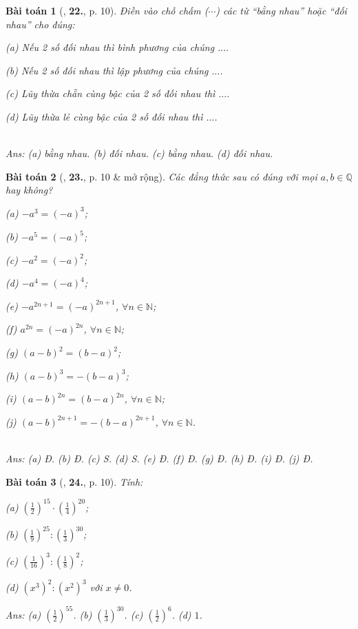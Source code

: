 \documentclass{article}
\numberwithin{equation}{section}
\newtheorem{baitoan}{Bài toán}
\begin{document}
\begin{baitoan}[\cite{Binh_Toan_7_tap_1}, \textbf{22.}, p. 10]
	Điền vào chỗ chấm ($\cdots$) các từ ``bằng nhau'' hoặc ``đối nhau'' cho đúng:
	\begin{enumerate*}
		\item[(a)] Nếu 2 số đối nhau thì bình phương của chúng $\ldots$.
		\item[(b)] Nếu 2 số đối nhau thì lập phương của chúng $\ldots$.
		\item[(c)] Lũy thừa chẵn cùng bậc của 2 số đối nhau thì $\ldots$.
		\item[(d)] Lũy thừa lẻ cùng bậc của 2 số đối nhau thì $\ldots$.
	\end{enumerate*}\\\mbox{}\hfill\textsf{Ans:} (a) bằng nhau. (b) đối nhau. (c) bằng nhau. (d) đối nhau.
\end{baitoan}

\begin{baitoan}[\cite{Binh_Toan_7_tap_1}, \textbf{23.}, p. 10 \& mở rộng]
	Các đẳng thức sau có đúng với mọi $a,b\in\mathbb{Q}$ hay không?
	\begin{enumerate*}
		\item[(a)] $-a^3 = (-a)^3$;
		\item[(b)] $-a^5 = (-a)^5$;
		\item[(c)] $-a^2 = (-a)^2$;
		\item[(d)] $-a^4 = (-a)^4$;
		\item[(e)] $-a^{2n+1} = (-a)^{2n+1}$, $\forall n\in\mathbb{N}$;
		\item[(f)] $a^{2n} = (-a)^{2n}$, $\forall n\in\mathbb{N}$;
		\item[(g)] $(a - b)^2 = (b - a)^2$;
		\item[(h)] $(a - b)^3 = -(b - a)^3$;
		\item[(i)] $(a - b)^{2n} = (b - a)^{2n}$, $\forall n\in\mathbb{N}$;
		\item[(j)] $(a - b)^{2n+1} = -(b - a)^{2n+1}$, $\forall n\in\mathbb{N}$.
	\end{enumerate*}\\\mbox{}\hfill\textsf{Ans:} (a) Đ. (b) Đ. (c) S. (d) S. (e) Đ. (f) Đ. (g) Đ. (h) Đ. (i) Đ. (j) Đ.
\end{baitoan}

\begin{baitoan}[\cite{Binh_Toan_7_tap_1}, \textbf{24.}, p. 10]
	Tính:
	\begin{enumerate*}
		\item[(a)] $\left(\frac{1}{2}\right)^{15}\cdot\left(\frac{1}{4}\right)^{20}$;
		\item[(b)] $\left(\frac{1}{9}\right)^{25}:\left(\frac{1}{3}\right)^{30}$;
		\item[(c)] $\left(\frac{1}{16}\right)^3:\left(\frac{1}{8}\right)^2$;
		\item[(d)] $(x^3)^2:(x^2)^3$ với $x\ne 0$.
	\end{enumerate*}\hfill\textsf{Ans:} (a) $\left(\frac{1}{2}\right)^{55}$. (b) $\left(\frac{1}{3}\right)^{30}$. (c) $\left(\frac{1}{2}\right)^6$. (d) $1$.
\end{baitoan}
\end{document}
